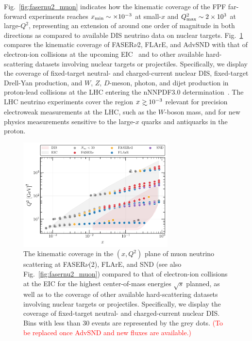 Fig.~\ref{fig:fasernu2_muon} indicates
how the kinematic coverage of the FPF far-forward experiments reaches
$x_{\rm min}\sim \times 10^{-3}$ at small-$x$ and $Q^2_{\rm max}\sim 2\times 10^3$
at large-$Q^2$, representing an extension
of around one order of magnitude in both directions as compared to available
DIS neutrino data on nuclear targets.
%
Fig.~\ref{fig:Kin_nNNPDF30_EIC_FPF} compares
the kinematic coverage of FASER$\nu$2, FLArE, and AdvSND with that of electron-ion collisions
at the upcoming EIC~\cite{Khalek:2021ulf,AbdulKhalek:2021gbh}
and to other available hard-scattering datasets involving
nuclear targets or projectiles.
%
Specifically, we display the coverage of fixed-target neutral- and charged-current nuclear DIS,
fixed-target Drell-Yan production, and $W$, $Z$, $D$-meson, photon, and dijet
production in proton-lead collisions at the LHC entering the  nNNPDF3.0
determination~\cite{AbdulKhalek:2022fyi}.
%
The LHC neutrino experiments cover the region $x\gsim 10^{-3}$ relevant
for precision electroweak measurements at the LHC, such as the $W$-boson
mass, and for new physics measurements sensitive to the large-$x$ quarks
and antiquarks in the proton.

\begin{figure}[t]
    \centering
    \includegraphics[width = 0.7\textwidth]{plots/KIN_DIS_FPF.pdf}
    \caption{The kinematic coverage in the $(x,Q^2)$ plane of muon neutrino scattering
      at FASER$\nu$(2), FLArE, and SND (see also Fig.~\ref{fig:fasernu2_muon})
      compared to that of electron-ion collisions at the EIC for the highest center-of-mass 
      energies $\sqrt{s}$ planned, as well as to the coverage of other available hard-scattering 
      datasets involving nuclear targets or projectiles.
      Specifically, we display the coverage of fixed-target neutral- and charged-current nuclear DIS.
      Bins with less than $30$ events are represented by the grey dots.
      \textcolor{red}{(To be replaced once AdvSND and new fluxes are available.)}
      }
    \label{fig:Kin_nNNPDF30_EIC_FPF}
\end{figure}

